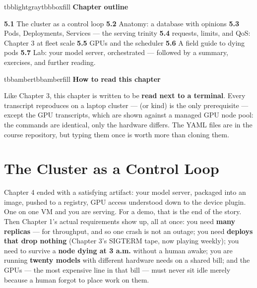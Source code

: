 \vspace{5.0pt}

\begin{calloutbox}{tbblightgray}{tbbboxfill}
{\normalsize\bfseries\color{tbbink}Chapter outline}\par\vspace{3pt}
\textbf{5.1} The cluster as a control loop    \textbf{5.2} Anatomy: a database with opinions    \textbf{5.3} Pods, Deployments, Services — the serving trinity    \textbf{5.4} requests, limits, and QoS: Chapter 3 at fleet scale    \textbf{5.5} GPUs and the scheduler    \textbf{5.6} A field guide to dying pods    \textbf{5.7} Lab: your model server, orchestrated — followed by a summary, exercises, and further reading.
\end{calloutbox}

\vspace{3.0pt}

\begin{calloutbox}{tbbamber}{tbbamberfill}
{\normalsize\bfseries\color{tbbamberdark}How to read this chapter}\par\vspace{3pt}
Like Chapter 3, this chapter is written to be \textbf{read next to a terminal}. Every transcript reproduces on a laptop cluster —  (or kind) is the only prerequisite — except the GPU transcripts, which are shown against a managed GPU node pool: the commands are identical, only the hardware differs. The YAML files are in the course repository, but typing them once is worth more than cloning them.
\end{calloutbox}

\section{The Cluster as a Control Loop}

Chapter 4 ended with a satisfying artifact: your model server, packaged into an image, pushed to a registry, GPU access understood down to the device plugin. One  on one VM and you are serving. For a demo, that is the end of the story. Then Chapter 1's actual requirements show up, all at once: you need \textbf{many replicas} — for throughput, and so one crash is not an outage; you need \textbf{deploys that drop nothing} (Chapter 3's SIGTERM tape, now playing weekly); you need to survive a \textbf{node dying at 3 a.m.} without a human awake; you are running \textbf{twenty models} with different hardware needs on a shared bill; and the GPUs — the most expensive line in that bill — must never sit idle merely because a human forgot to place work on them.

